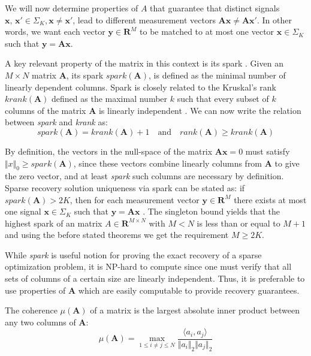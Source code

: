\documentclass[journal]{IEEEtran}
\begin{document}
We will now determine properties of $A$ that guarantee that distinct signals $\boldsymbol{x},\,\boldsymbol{x'}\in \Sigma_K, \boldsymbol{x}\neq \boldsymbol{x'}$, lead to different measurement vectors $\boldsymbol{A}\boldsymbol{x}\neq \boldsymbol{A}\boldsymbol{x'}$. In other words, we want each vector $\boldsymbol{y}\in \mathbf{R}^M$ to be matched to at most one vector $\boldsymbol{x}\in \Sigma_K$ such that $\boldsymbol{y}=\boldsymbol{A}\boldsymbol{x}$.

A key relevant property of the matrix in this context is its spark \cite{donoho2003optimally}. Given an $M\times N$ matrix $\boldsymbol{A}$, its spark $spark(\boldsymbol{A})$, is defined as the minimal number of linearly dependent columns. Spark is closely related to the Kruskal's rank $krank(\boldsymbol{A})$ defined as the maximal number $k$ such that every subset of $k$ columns of the matrix $\boldsymbol{A}$ is linearly independent \cite{kruskal1977three}. We can now write the relation between \textit{spark} and \textit{krank} as:
%
\begin{equation} \label{eq:skrank}
	spark(\boldsymbol{A})=krank(\boldsymbol{A})+1\quad \text{and} \quad rank(\boldsymbol{A})\geq krank(\boldsymbol{A})
\end{equation}

By definition, the vectors in the null-space of the matrix $\boldsymbol{A}\boldsymbol{x}=0$ must satisfy $\Vert x\Vert_0\geq spark(\boldsymbol{A})$, since these vectors combine linearly columns from $\boldsymbol{A}$ to give the zero vector, and at least \textit{spark} such columns are necessary by definition. Sparse recovery solution uniqueness via spark can be stated as: if $spark(\boldsymbol{A})>2K$, then for each measurement vector $\boldsymbol{y}\in\mathbf{R}^M$ there exists at most one signal $\boldsymbol{x}\in\Sigma_K$ such that $\boldsymbol{y}=\boldsymbol{A}\boldsymbol{x}$ \cite{Rish2015}. The singleton bound yields that the highest spark of an matrix $A\in\mathbf{R}^{M\times N}$ with $M<N$ is less than or equal to $M+1$ and using the before stated theorems we get the requirement $M\geq 2K$.

While \textit{spark} is useful notion for proving the exact recovery of a sparse optimization problem, it is NP-hard to compute since one must verify that all sets of columns of a certain size are linearly independent. Thus, it is preferable to use properties of $\boldsymbol{A}$ which are easily computable to provide recovery guarantees.

The coherence $\mu(\boldsymbol{A})$ of a matrix is the largest absolute inner product between any two columns of $\boldsymbol{A}$:
%
\begin{equation} \label{eq:coherence}
	\mu(\boldsymbol{A})=\max\limits_{1\leq i\neq j\leq N}\frac{\langle a_i,
		a_j\rangle}{\Vert a_i\Vert_2 \Vert a_j\Vert_2}
\end{equation}
\end{document}
